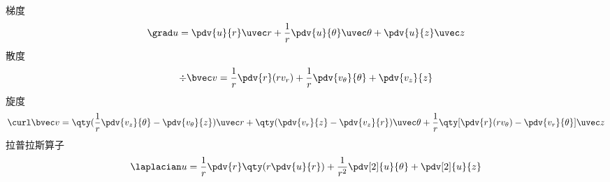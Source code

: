 
\begin{issues}
\issueDraft
\end{issues}

梯度
\begin{equation}
\grad u = \pdv{u}{r} \uvec r + \frac{1}{r}\pdv{u}{\theta}\uvec \theta + \pdv{u}{z}\uvec z
\end{equation}
散度
\begin{equation}
\div \bvec v = \frac{1}{r}\pdv{r} (r v_r) + \frac{1}{r} \pdv{v_\theta}{\theta} + \pdv{v_z}{z}
\end{equation}
旋度
\begin{equation}
\curl \bvec v = \qty(\frac{1}{r}\pdv{v_z}{\theta} - \pdv{v_\theta}{z})\uvec r + \qty(\pdv{v_r}{z} - \pdv{v_z}{r})\uvec \theta + \frac{1}{r}\qty[\pdv{r}(r v_\theta) - \pdv{v_r}{\theta}] \uvec z
\end{equation}
拉普拉斯算子
\begin{equation}
\laplacian u = \frac{1}{r}\pdv{r}\qty(r \pdv{u}{r}) + \frac{1}{r^2} \pdv[2]{u}{\theta} + \pdv[2]{u}{z}
\end{equation}
